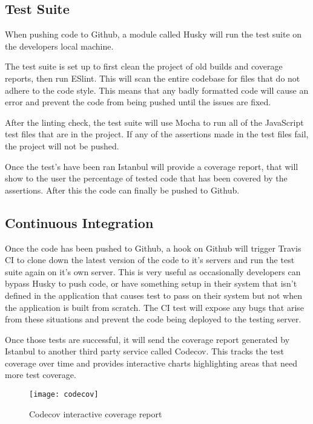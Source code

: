   \subsection{Test Suite}
  When pushing code to Github, a module called Husky\cite{husky} will run the test suite on the developers local machine.

    The test suite is set up to first clean the project of old builds and coverage reports, then run ESlint\cite{eslint}. This will scan the entire codebase for files that do not adhere to the code style. This means that any badly formatted code will cause an error and prevent the code from being pushed until the issues are fixed.

    After the linting check, the test suite will use Mocha\cite{mocha} to run all of the JavaScript test files that are in the project. If any of the assertions made in the test files fail, the project will not be pushed. 

    Once the test's have been ran Istanbul\cite{istanbul} will provide a coverage report, that will show to the user the percentage of tested code that has been covered by the assertions. After this the code can finally be pushed to Github. 
    
  \subsection{Continuous Integration}
    Once the code has been pushed to Github, a hook on Github will trigger Travis CI\cite{travis} to clone down the latest version of the code to it's servers and run the test suite again on it's own server. This is very useful as occasionally developers can bypass Husky to push code, or have something setup in their system that isn't defined in the application that causes test to pass on their system but not when the application is built from scratch. The CI test will expose any bugs that arise from these situations and prevent the code being deployed to the testing server. 

    Once those tests are successful, it will send the coverage report generated by Istanbul to another third party service called Codecov\cite{codecov}. This tracks the test coverage over time and provides interactive charts highlighting areas that need more test coverage. 

\begin{figure}[H]
\begin{center}
\texttt{[image: codecov]}
\caption{Codecov interactive coverage report}
\end{center}
\end{figure}


